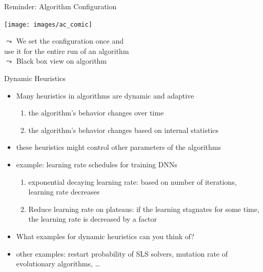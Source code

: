 \begin{frame}[c]{Reminder: Algorithm Configuration}

\texttt{[image: images/ac\_comic]}

\pause

\bigskip
$\leadsto$ \alert{We set the configuration once and\\ use it for the entire run of an algorithm}\\
$\leadsto$ \alert{Black box view on algorithm}
\end{frame}
\begin{frame}[c]{Dynamic Heuristics}

\begin{itemize}
  \item Many heuristics in algorithms are dynamic and adaptive
  \begin{enumerate}
    \item the algorithm's behavior changes over time
    \item the algorithm's behavior changes based on internal statistics
  \end{enumerate}
  \medskip
  \item these heuristics might control other parameters of the algorithms
  \pause
  \smallskip
  \item example: learning rate schedules for training DNNs
  \begin{enumerate}
  	\item exponential decaying learning rate: based on number of iterations, learning rate decreases
  	\pause
  	\item Reduce learning rate on plateaus: if the learning stagnates for some time, the learning rate is decreased by a factor
  \end{enumerate}
  \pause
  \item What examples for dynamic heuristics can you think of? \hands
  \pause
  \item other examples: restart probability of SLS solvers, mutation rate of evolutionary algorithms, \ldots  
  
\end{itemize}

\end{frame}
